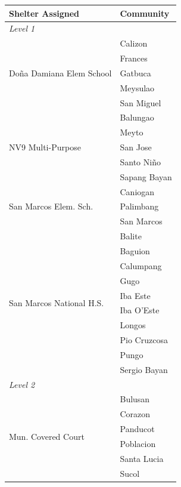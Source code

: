 	\begin{table}[h!]
	    \centering
	    \renewcommand{\arraystretch}{1.2}
	    \begin{tabular}{ll}
	        \toprule
	        \textbf{Shelter Assigned} & \textbf{Community} \\
	        \midrule
	        \multicolumn{2}{l}{\textit{Level 1}} \\
	        \hline
	        \multirow{5}{*}{Doña Damiana Elem School} 
	            & Calizon \\
	            & Frances \\
	            & Gatbuca \\
	            & Meysulao \\
	            & San Miguel \\
	        \hline
	        \multirow{5}{*}{NV9 Multi-Purpose}
	            & Balungao \\
	            & Meyto \\
	            & San Jose \\
	            & Santo Niño \\
	            & Sapang Bayan \\
	        \hline
	        \multirow{3}{*}{San Marcos Elem. Sch.}
	            & Caniogan \\
	            & Palimbang \\
	            & San Marcos \\
	        \hline
	        \multirow{10}{*}{San Marcos National H.S.}
	            & Balite \\
	            & Baguion \\
	            & Calumpang \\
	            & Gugo \\
	            & Iba Este \\
	            & Iba O'Este \\
	            & Longos \\
	            & Pio Cruzcosa \\
	            & Pungo \\
	            & Sergio Bayan \\
	        \hline
	        \multicolumn{2}{l}{\textit{Level 2}} \\
	        \hline
	        \multirow{6}{*}{Mun. Covered Court}
	            & Bulusan \\
	            & Corazon \\
	            & Panducot \\
	            & Poblacion \\
	            & Santa Lucia \\
	            & Sucol \\
	        \bottomrule
	    \end{tabular}
	\end{table}
	
